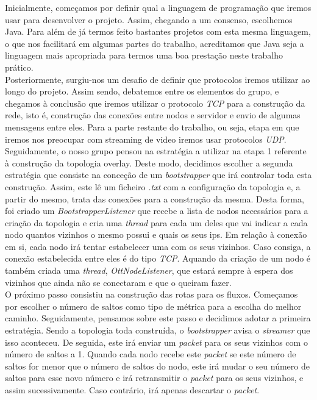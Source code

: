 \documentclass[a4paper, 11pt]{article}
\begin{document}
\newpage

Inicialmente, começamos por definir qual a linguagem de programação que iremos usar para desenvolver o projeto. Assim, chegando a um consenso, escolhemos Java. Para além de já termos feito bastantes projetos com esta mesma linguagem, o que nos facilitará em algumas partes do trabalho, acreditamos que Java seja a linguagem mais apropriada para termos uma boa prestação neste trabalho prático.\\ 

Posteriormente, surgiu-nos um desafio de definir que protocolos iremos utilizar ao longo do projeto. Assim sendo, debatemos entre os elementos do grupo, e chegamos à conclusão que iremos utilizar o protocolo \textit{TCP} para a construção da rede, isto é, construção das conexões entre nodos e servidor e envio de algumas mensagens entre eles. Para a parte restante do trabalho, ou seja, etapa em que iremos nos preocupar com streaming de video iremos usar protocolos \textit{UDP}.\\

Seguidamente, o nosso grupo pensou na estratégia a utilizar na etapa 1 referente à construção da topologia overlay. Deste modo, decidimos escolher a segunda estratégia que consiste na conceção de um \textit{bootstrapper} que irá controlar toda esta construção. Assim, este lê um ficheiro \textit{.txt} com a configuração da topologia e, a partir do mesmo,  trata das conexões para a construção da mesma. Desta forma, foi criado um \textit{BootstrapperListener} que recebe a lista de nodos necessários para a criação da topologia e cria uma \textit{thread} para cada um deles que vai indicar a cada nodo quantos vizinhos o mesmo possui e quais os seus ips. Em relação à conexão em si, cada nodo irá tentar estabelecer uma com os seus vizinhos. Caso consiga, a conexão estabelecida entre eles é do tipo \textit{TCP}. Aquando da criação de um nodo é também criada uma \textit{thread}, \textit{OttNodeListener}, que estará sempre à espera dos vizinhos que ainda não se conectaram e que o queiram fazer.\\

O próximo passo consistiu na construção das rotas para os fluxos. Começamos por escolher o número de saltos como tipo de métrica para a escolha do melhor caminho. Seguidamente, pensamos sobre este passo e decidimos adotar a primeira estratégia. Sendo a topologia toda construída, o \textit{bootstrapper} avisa o \textit{streamer} que isso aconteceu. De seguida, este irá enviar um \textit{packet} para os seus vizinhos com o número de saltos a 1. Quando cada nodo recebe este \textit{packet} se este número de saltos for menor que o número de saltos do nodo, este irá mudar o seu número de saltos para esse novo número e irá retransmitir o \textit{packet} para os seus vizinhos, e assim sucessivamente. Caso contrário, irá apenas descartar o \textit{packet}.\\
\end{document}
